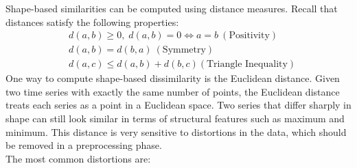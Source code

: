 Shape-based similarities can be computed using distance measures. Recall that distances satisfy the following properties:
\begin{align*}
    &d(a,b) \geq 0,\; d(a,b) = 0 \iff a = b \ (\text{Positivity}) \\
    &d(a,b) = d(b,a) \ (\text{Symmetry}) \\
    &d(a,c) \leq d(a,b) + d(b,c) (\text{Triangle Inequality})
\end{align*}
One way to compute shape-based dissimilarity is the Euclidean distance. Given two time series with exactly the same number of points, the Euclidean distance treats each series as a point in a Euclidean space. Two series that differ sharply in shape can still look similar in terms of structural features such as maximum and minimum. This distance is very sensitive to distortions in the data, which should be removed in a preprocessing phase.\\
The most common distortions are:
